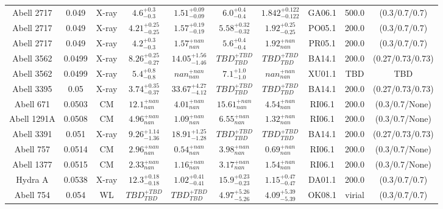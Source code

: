 \begin{table}
\begin{tabular}{cccccccccc}
Abell 2717 & 0.049 & X-ray & ${4.6}^{+0.3}_{-0.3}$ & ${1.51}^{+0.09}_{-0.09}$ & ${6.0}^{+0.4}_{-0.4}$ & ${1.842}^{+0.122}_{-0.122}$ & GA06.1 & 500.0 & (0.3/0.7/0.7) \\
Abell 2717 & 0.049 & X-ray & ${4.21}^{+0.25}_{-0.25}$ & ${1.57}^{+0.19}_{-0.19}$ & ${5.58}^{+0.32}_{-0.32}$ & ${1.92}^{+0.25}_{-0.25}$ & PO05.1 & 200.0 & (0.3/0.7/0.7) \\
Abell 2717 & 0.049 & X-ray & ${4.2}^{+0.3}_{-0.3}$ & ${1.57}^{+nan}_{nan}$ & ${5.6}^{+0.4}_{-0.4}$ & ${1.92}^{+nan}_{nan}$ & PR05.1 & 200.0 & (0.3/0.7/0.7) \\
Abell 3562 & 0.0499 & X-ray & ${8.26}^{+0.25}_{-0.27}$ & ${14.05}^{+1.56}_{-1.46}$ & ${TBD}^{+TBD}_{TBD}$ & ${TBD}^{+TBD}_{TBD}$ & BA14.1 & 200.0 & (0.27/0.73/0.73) \\
Abell 3562 & 0.0499 & X-ray & ${5.4}^{+0.8}_{-0.8}$ & ${nan}^{+nan}_{nan}$ & ${7.1}^{+1.0}_{-1.0}$ & ${nan}^{+nan}_{nan}$ & XU01.1 & TBD & TBD \\
Abell 3395 & 0.05 & X-ray & ${3.74}^{+0.35}_{-0.37}$ & ${33.67}^{+4.27}_{-4.12}$ & ${TBD}^{+TBD}_{TBD}$ & ${TBD}^{+TBD}_{TBD}$ & BA14.1 & 200.0 & (0.27/0.73/0.73) \\
Abell 671 & 0.0503 & CM & ${12.1}^{+nan}_{nan}$ & ${4.01}^{+nan}_{nan}$ & ${15.61}^{+nan}_{nan}$ & ${4.54}^{+nan}_{nan}$ & RI06.1 & 200.0 & (0.3/0.7/None) \\
Abell 1291A & 0.0508 & CM & ${4.96}^{+nan}_{nan}$ & ${1.09}^{+nan}_{nan}$ & ${6.55}^{+nan}_{nan}$ & ${1.32}^{+nan}_{nan}$ & RI06.1 & 200.0 & (0.3/0.7/None) \\
Abell 3391 & 0.051 & X-ray & ${9.26}^{+1.14}_{-1.36}$ & ${18.91}^{+1.25}_{-1.28}$ & ${TBD}^{+TBD}_{TBD}$ & ${TBD}^{+TBD}_{TBD}$ & BA14.1 & 200.0 & (0.27/0.73/0.73) \\
Abell 757 & 0.0514 & CM & ${2.96}^{+nan}_{nan}$ & ${0.54}^{+nan}_{nan}$ & ${3.98}^{+nan}_{nan}$ & ${0.69}^{+nan}_{nan}$ & RI06.1 & 200.0 & (0.3/0.7/None) \\
Abell 1377 & 0.0515 & CM & ${2.33}^{+nan}_{nan}$ & ${1.16}^{+nan}_{nan}$ & ${3.17}^{+nan}_{nan}$ & ${1.54}^{+nan}_{nan}$ & RI06.1 & 200.0 & (0.3/0.7/None) \\
Hydra A & 0.0538 & X-ray & ${12.3}^{+0.18}_{-0.18}$ & ${1.02}^{+0.41}_{-0.41}$ & ${15.9}^{+0.23}_{-0.23}$ & ${1.15}^{+0.47}_{-0.47}$ & DA01.1 & 200.0 & (0.3/0.7/0.7) \\
Abell 754 & 0.054 & WL & ${TBD}^{+TBD}_{TBD}$ & ${TBD}^{+TBD}_{TBD}$ & ${4.97}^{+5.26}_{-5.26}$ & ${4.09}^{+5.39}_{-5.39}$ & OK08.1 & virial & (0.3/0.7/0.7) \\

\end{tabular}
\end{table}
